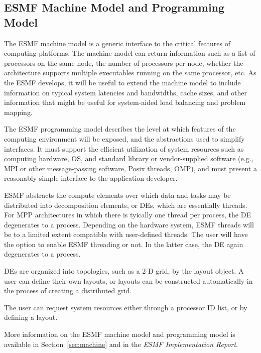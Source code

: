 \subsection{ESMF Machine Model and Programming Model}
\label{sec:progmodel}

The ESMF machine model is a generic interface to the critical features of 
computing platforms.  The machine model can return information
such as a list of processors on the same node, the number of processors
per node, whether the architecture supports multiple executables 
running on the same processor, etc.  As the ESMF develops, it will be useful
to extend the machine model to include information on typical system
latencies and bandwidths, cache sizes, and other information that 
might be useful for system-aided load balancing and problem mapping.

The ESMF programming model describes the level at which features of the 
computing environment will be exposed, and the abstractions used to 
simplify interfaces.  It must support the 
efficient utilization of system resources such as   
computing hardware, OS, and standard library or vendor-supplied 
software (e.g., MPI or other message-passing software, Posix threads, OMP),
and must present a reasonably simple interface to the application 
developer.

ESMF abstracts the compute elements over which data and tasks may be
distributed into decomposition elements, or DEs, which
are essentially threads.  For MPP architectures in which there
is tyically one thread per process, the DE degenerates to a process.
Depending on the hardware system, ESMF threads will be to a limited 
extent compatible with user-defined threads.  The user will have 
the option to enable ESMF threading or not.  In the latter case, the
DE again degenerates to a process.

DEs are organized into topologies, such as a 2-D grid, by the layout 
object.  A user can define their own layouts, or layouts can be 
constructed automatically in the process of creating a distributed 
grid.

The user can request system resources either through a processor
ID list, or by defining a layout.

More information on the ESMF machine model and programming model
is available in Section~\ref{sec:machine} and in the {\it ESMF
Implementation Report}.






